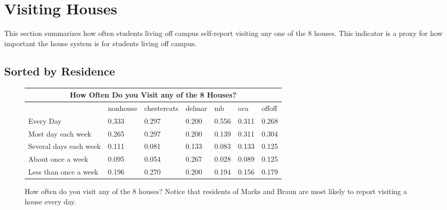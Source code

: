 \documentclass[12pt]{article} %
\begin{document}
\section{Visiting Houses}
This section summarizes how often students living off campus self-report visiting any one of the 8 houses. This indicator is a proxy for how important the house system is for students living off campus.

\subsection{Sorted by Residence}
\vspace{-5mm}
\begin{figure}[H]
	\begin{center}
\begin{tabular}{|m{6 cm}|m{1.7 cm}|m{2 cm}|m{1.3 cm}|m{1.3 cm}|m{1.3 cm}|m{1.3 cm} |}
\hline
\multicolumn{7}{|c|}{How Often Do you Visit any of the 8 Houses?}\\ \hline
& nonhouse& chestercats& delmar& mb& oca& offoff\\ \hline
Every Day   &  0.333 &  0.297 &  0.200 &  0.556 &  0.311 &  0.268\\ \hline
Most day each week   &  0.265 &  0.297 &  0.200 &  0.139 &  0.311 &  0.304\\ \hline
Several days each week   &  0.111 &  0.081 &  0.133 &  0.083 &  0.133 &  0.125\\ \hline
About once a week   &  0.095 &  0.054 &  0.267 &  0.028 &  0.089 &  0.125\\ \hline
Less than once a week   &  0.196 &  0.270 &  0.200 &  0.194 &  0.156 &  0.179\\ \hline
\end{tabular}
\end{center}
	\caption{How often do you visit any of the 8 houses? Notice that residents of Marks and Braun are most likely
	to report visiting a house every day.}

\end{figure}
\end{document}
